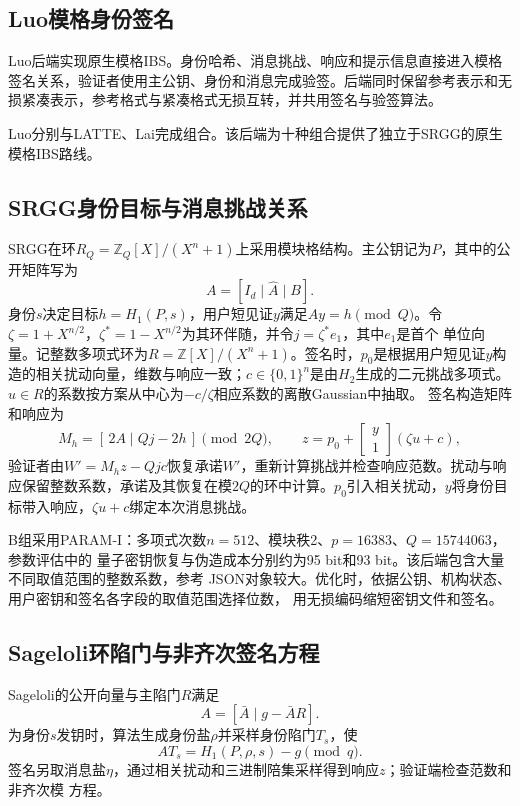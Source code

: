 \subsection{Luo模格身份签名}

Luo后端实现原生模格IBS\cite{luo2024ibs}。身份哈希、消息挑战、响应和提示信息直接进入模格
签名关系，验证者使用主公钥、身份和消息完成验签。后端同时保留参考表示和无损紧凑表示，参考格式与紧凑格式无损互转，并共用签名与验签算法。

Luo分别与LATTE、Lai完成组合。该后端为十种组合提供了独立于SRGG的原生模格IBS路线。

\subsection{SRGG身份目标与消息挑战关系}

SRGG在环$R_Q=\mathbb Z_Q[X]/(X^n+1)$上采用模块格结构。主公钥记为$P$，其中的公开矩阵写为
\[
 A=[I_d\mid\widehat A\mid B].
\]
身份$s$决定目标$h=H_1(P,s)$，用户短见证$y$满足$Ay=h\pmod Q$。令
$\zeta=1+X^{n/2}$，$\zeta^*=1-X^{n/2}$为其环伴随，并令$j=\zeta^*e_1$，其中$e_1$是首个
单位向量。记整数多项式环为$R=\mathbb Z[X]/(X^n+1)$。签名时，$p_0$是根据用户短见证$y$构造的相关扰动向量，维数与响应一致；$c\in\{0,1\}^n$是由$H_2$生成的二元挑战多项式。$u\in R$的系数按方案从中心为$-c/\zeta$相应系数的离散Gaussian中抽取。
签名构造矩阵和响应为
\[
 M_h=[\,2A\mid Qj-2h\,]\pmod{2Q},
 \qquad
 z=p_0+\begin{bmatrix}y\\1\end{bmatrix}(\zeta u+c),
\]
验证者由$W'=M_hz-Qjc$恢复承诺$W'$，重新计算挑战并检查响应范数\cite{jia2025ibs}。扰动与响应保留整数系数，承诺及其恢复在模$2Q$的环中计算。$p_0$引入相关扰动，$y$将身份目标带入响应，$\zeta u+c$绑定本次消息挑战。

B组采用PARAM-I：多项式次数$n=512$、模块秩2、$p=16383$、$Q=15744063$，参数评估中的
量子密钥恢复与伪造成本分别约为95 bit和93 bit。该后端包含大量不同取值范围的整数系数，参考
JSON对象较大。优化时，依据公钥、机构状态、用户密钥和签名各字段的取值范围选择位数，
用无损编码缩短密钥文件和签名。

\subsection{Sageloli环陷门与非齐次签名方程}

Sageloli的公开向量与主陷门$R$满足
\[
 A=[\bar A\mid g-\bar AR].
\]
为身份$s$发钥时，算法生成身份盐$\rho$并采样身份陷门$T_s$，使
\[
 AT_s=H_1(P,\rho,s)-g\pmod q.
\]
签名另取消息盐$\eta$，通过相关扰动和三进制陪集采样得到响应$z$；验证端检查范数和非齐次模
方程\cite{sageloli2023ibs}。

